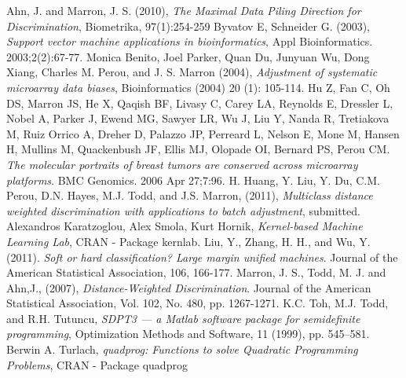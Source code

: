 \documentclass{bioinfo}
\begin{document}
\begin{thebibliography}{}

Ahn, J. and Marron, J. S. (2010), \textit{The
Maximal Data Piling Direction for Discrimination}, Biometrika, 97(1):254-259
Byvatov E, Schneider G. (2003),
\textit{Support vector machine applications in bioinformatics}, Appl
Bioinformatics. 2003;2(2):67-77. 
Monica Benito, Joel Parker, Quan Du, Junyuan
Wu, Dong Xiang, Charles M. Perou, and J. S. Marron (2004), \textit{Adjustment of
systematic microarray data biases}, Bioinformatics (2004) 20 (1): 105-114.
Hu Z, Fan C, Oh DS, Marron JS, He X, Qaqish BF,
Livasy C, Carey LA, Reynolds E, Dressler L, Nobel A, Parker J, Ewend MG, Sawyer
LR, Wu J, Liu Y, Nanda R, Tretiakova M, Ruiz Orrico A, Dreher D, Palazzo JP,
Perreard L, Nelson E, Mone M, Hansen H, Mullins M, Quackenbush JF, Ellis MJ,
Olopade OI, Bernard PS, Perou CM. \textit{The molecular portraits of breast
tumors are conserved across microarray platforms}. BMC Genomics. 2006 Apr
27;7:96. 
H. Huang, Y. Liu, Y. Du, C.M. Perou, D.N.
Hayes, M.J. Todd, and J.S. Marron, (2011), \textit{Multiclass distance weighted
discrimination with applications to batch adjustment}, submitted. 
Alexandros Karatzoglou, Alex Smola, Kurt
Hornik, \textit{Kernel-based Machine Learning Lab}, CRAN - Package kernlab. 
Liu, Y., Zhang, H. H., and Wu, Y. (2011).
\textit{Soft or hard classification? Large margin unified machines}. Journal of
the American Statistical Association, 106, 166-177. 
 Marron, J. S., Todd, M. J. and Ahn,J.,
(2007), \textit{Distance-Weighted Discrimination}. Journal of the American
Statistical Association, Vol. 102, No. 480, pp. 1267-1271.
K.C. Toh, M.J. Todd, and R.H. Tutuncu, \textit{SDPT3
--- a Matlab software package for semidefinite programming}, Optimization
Methods and Software, 11 (1999), pp. 545--581. 
Berwin A. Turlach, \textit{quadprog: Functions to
solve Quadratic Programming Problems}, CRAN - Package quadprog

\end{thebibliography}
\end{document}
